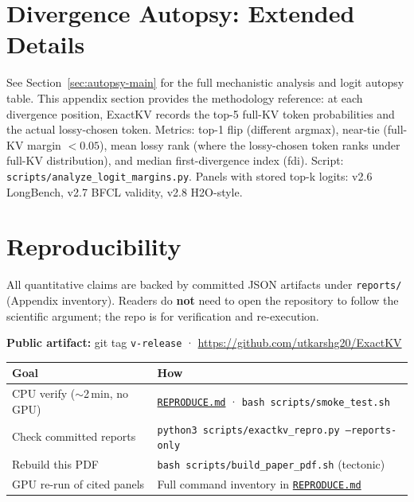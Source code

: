 \documentclass[11pt]{article}
\begin{document}
\section{Divergence Autopsy: Extended Details}
\label{sec:autopsy}

See Section~\ref{sec:autopsy-main} for the full mechanistic analysis and logit
autopsy table. This appendix section provides the methodology reference:
at each divergence position, ExactKV records the top-5 full-KV token probabilities
and the actual lossy-chosen token. Metrics: top-1 flip (different argmax), near-tie
(full-KV margin $<0.05$), mean lossy rank (where the lossy-chosen token ranks
under full-KV distribution), and median first-divergence index (fdi).
Script: \texttt{scripts/analyze\_logit\_margins.py}.
Panels with stored top-k logits: v2.6 LongBench, v2.7 BFCL validity, v2.8 H2O-style.

\section{Reproducibility}

All quantitative claims are backed by committed JSON artifacts under
\texttt{reports/} (Appendix inventory). Readers do \textbf{not} need to open the
repository to follow the scientific argument; the repo is for verification and
re-execution.

\noindent\textbf{Public artifact:} git tag \texttt{v-release} ·
\url{https://github.com/utkarshg20/ExactKV}

\begin{center}
\small
\begin{tabularx}{\textwidth}{@{}lX@{}}
\toprule
\textbf{Goal} & \textbf{How} \\
\midrule
CPU verify ($\sim$2\,min, no GPU)
  & \href{https://github.com/utkarshg20/ExactKV/blob/main/REPRODUCE.md}{\texttt{REPRODUCE.md}} · \texttt{bash scripts/smoke\_test.sh} \\
Check committed reports
  & \texttt{python3 scripts/exactkv\_repro.py --reports-only} \\
Rebuild this PDF
  & \texttt{bash scripts/build\_paper\_pdf.sh} (tectonic) \\
GPU re-run of cited panels
  & Full command inventory in \href{https://github.com/utkarshg20/ExactKV/blob/main/REPRODUCE.md}{\texttt{REPRODUCE.md}} \\
\bottomrule
\end{tabularx}
\end{center}

\bigskip


\end{document}
